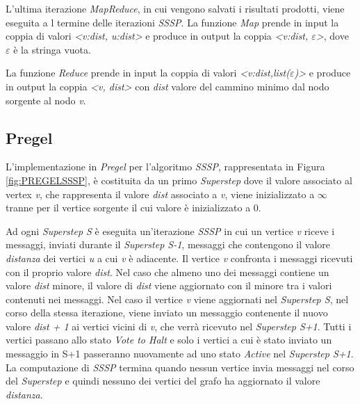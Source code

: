 \documentclass[LaM,binding=0.6cm]{sapthesis}
\begin{document}
L'ultima iterazione \textit{MapReduce}, in cui vengono salvati i risultati prodotti, viene eseguita a l termine  delle iterazioni \textit{SSSP}.
La funzione \textit{Map} prende in input la coppia di valori \textit{<v:dist, u:dist>}  e produce in output la coppia \textit{<v:dist, $\varepsilon$>}, dove $\varepsilon$ è la stringa vuota.

La funzione \textit{Reduce} prende in input la coppia di valori \textit{<v:dist,list($\varepsilon$)>} e produce in output la coppia \textit{<v, dist>} con \textit{dist} valore del cammino minimo dal nodo sorgente al nodo \textit{v}.


\begin{minipage}{\linewidth}
		
\end{minipage}
\begin{minipage}{\linewidth}

\end{minipage}		

\subsection{Pregel}

L'implementazione in \textit{Pregel} per l'algoritmo \textit{SSSP}, rappresentata in Figura \ref{fig:PREGELSSSP}, è costituita da un primo \textit{Superstep} dove il valore associato al vertex \textit{v},  che rappresenta il valore \textit{dist} associato a \textit{v}, viene inizializzato a $\infty$ tranne per il vertice sorgente il cui valore è inizializzato a 0.


Ad ogni \textit{Superstep S} è eseguita un'iterazione \textit{SSSP} in cui un vertice \textit{v} riceve i messaggi, inviati durante il \textit{Superstep S-1}, messaggi che contengono il valore \textit{distanza} dei vertici \textit{u} a cui \textit{v} è adiacente.
Il vertice \textit{v} confronta i messaggi ricevuti con il proprio valore \textit{dist}. Nel caso che almeno uno dei messaggi contiene un valore \textit{dist} minore, il valore di \textit{dist} viene aggiornato con il minore tra i valori contenuti nei messaggi.
Nel caso il vertice \textit{v} viene aggiornati nel \textit{Superstep S}, nel corso della stessa iterazione, viene inviato un messaggio contenente il nuovo valore \textit{dist + 1} ai vertici vicini di \textit{v}, che verrà ricevuto nel \textit{Superstep S+1}. Tutti i vertici passano allo stato \textit{Vote to Halt} e solo i vertici a cui è stato inviato un messaggio in S+1 passeranno nuovamente ad uno stato \textit{Active} nel  \textit{Superstep S+1}.
La computazione di \textit{SSSP} termina quando nessun vertice invia messaggi nel corso del \textit{Superstep} e quindi nessuno dei vertici del grafo ha aggiornato il valore \textit{distanza}.
\end{document}
